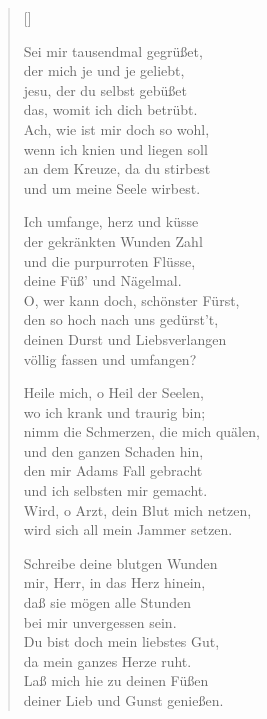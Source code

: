\begin{multicols}{2}
\settowidth{\versewidth}{Heile mich, o Heil der Seelen,}
\begin{verse}[\versewidth]


 Sei mir tausendmal gegrüßet,\\
der mich je und je geliebt,\\
jesu, der du selbst gebüßet\\
das, womit ich dich betrübt.\\
Ach, wie ist mir doch so wohl,\\
wenn ich knien und liegen soll\\
an dem Kreuze, da du stirbest\\
und um meine Seele wirbest.

 Ich umfange, herz und küsse\\
der gekränkten Wunden Zahl\\
und die purpurroten Flüsse,\\
deine Füß' und Nägelmal.\\
O, wer kann doch, schönster Fürst,\\
den so hoch nach uns gedürst't,\\
deinen Durst und Liebsverlangen\\
völlig fassen und umfangen?

 Heile mich, o Heil der Seelen,\\
wo ich krank und traurig bin;\\
nimm die Schmerzen, die mich quälen,\\
und den ganzen Schaden hin,\\
den mir Adams Fall gebracht\\
und ich selbsten mir gemacht.\\
Wird, o Arzt, dein Blut mich netzen,\\
wird sich all mein Jammer setzen.

 Schreibe deine blutgen Wunden\\
mir, Herr, in das Herz hinein,\\
daß sie mögen alle Stunden\\
bei mir unvergessen sein.\\
Du bist doch mein liebstes Gut,\\
da mein ganzes Herze ruht.\\
Laß mich hie zu deinen Füßen\\
deiner Lieb und Gunst genießen.

\end{verse}
\end{multicols}

